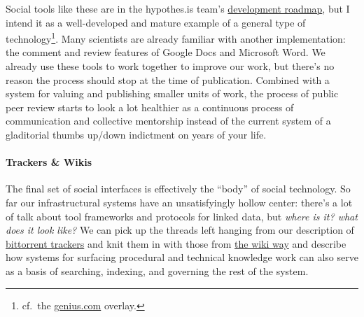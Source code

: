 \documentclass[10pt]{article}
\begin{document}
\begin{multicols}{2}
Social tools like these are in the hypothes.is team's
\href{https://web.archive.org/web/20211015213849/https://github.com/hypothesis/product-backlog/projects/6}{development
roadmap}, but I intend it as a well-developed and mature example of a
general type of technology\footnote{cf.~the
  \href{https://genius.com}{genius.com} overlay.}. Many scientists are
already familiar with another implementation: the comment and review
features of Google Docs and Microsoft Word. We already use these tools
to work together to improve our work, but there's no reason the process
should stop at the time of publication. Combined with a system for
valuing and publishing smaller units of work, the process of public peer
review starts to look a lot healthier as a continuous process of
communication and collective mentorship instead of the current system of
a gladitorial thumbs up/down indictment on years of your life.

\hypertarget{trackers-wikis}{%
\paragraph{Trackers \& Wikis}\label{trackers-wikis}}

The final set of social interfaces is effectively the ``body'' of social
technology. So far our infrastructural systems have an unsatisfyingly
hollow center: there's a lot of talk about tool frameworks and protocols
for linked data, but \emph{where is it? what does it look like?} We can
pick up the threads left hanging from our description of
\protect\hyperlink{archives-need-communities}{bittorrent trackers} and
knit them in with those from \protect\hyperlink{the-wiki-way}{the wiki
way} and describe how systems for surfacing procedural and technical
knowledge work can also serve as a basis of searching, indexing, and
governing the rest of the system.


\end{multicols}
\end{document}
